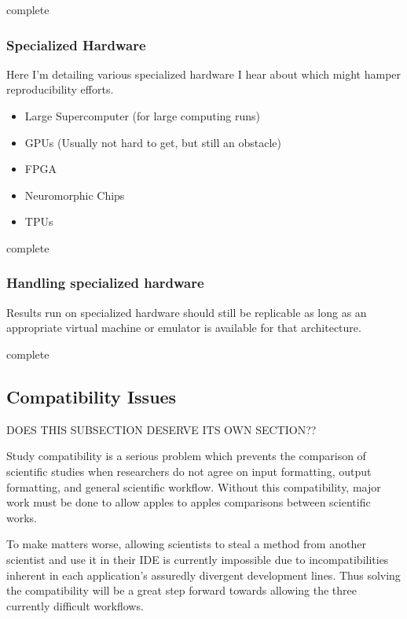 \documentclass[american]{article}
\newcommand{\complete}{
	\gls{complete}
}
\begin{document}
\complete

\subsubsection{Specialized Hardware} \label{sec:repro-spec-hardware}

Here I'm detailing various specialized hardware I hear about which might hamper reproducibility efforts.

\begin{itemize}
\item Large Supercomputer (for large computing runs)
\item GPUs (Usually not hard to get, but still an obstacle)
\item FPGA
\item Neuromorphic Chips \cite{neuromorphic-chips-webarticle}
\item TPUs \cite{jouppi-tpu-performance-2017}
\end{itemize}

\complete

\subsubsection{Handling specialized hardware} \label{sec:repro-spec-hardware-handling}

Results run on specialized hardware should still be replicable as long as an appropriate virtual machine or emulator is available for that architecture.

\complete

\subsection{Compatibility Issues} \label{sec:repro-compatibility-issues}

DOES THIS SUBSECTION DESERVE ITS OWN SECTION??

Study compatibility is a serious problem which prevents the comparison of scientific studies when researchers do not agree on input formatting, output formatting, and general scientific workflow. Without this compatibility, major work must be done to allow apples to apples comparisons between scientific works.

To make matters worse, allowing scientists to steal a method from another scientist and use it in their IDE is currently impossible due to incompatibilities inherent in each application's assuredly divergent development lines. Thus solving the compatibility will be a great step forward towards allowing the three currently difficult workflows.
\end{document}
